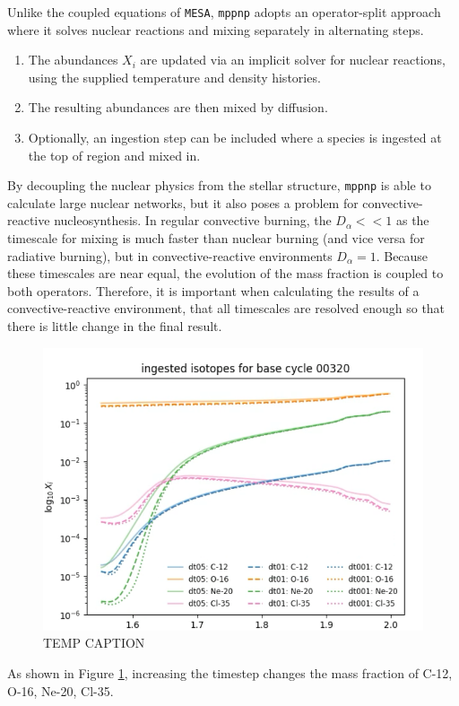 Unlike the coupled equations of \texttt{MESA}, \texttt{mppnp} adopts an operator-split approach where it solves nuclear reactions and mixing separately in alternating steps.

\begin{enumerate}
\item The abundances $X_i$ are updated via an implicit solver for nuclear reactions, using the supplied temperature and density histories.
\item The resulting abundances are then mixed by diffusion.
\item Optionally, an ingestion step can be included where a species is ingested at the top of region and mixed in.
\end{enumerate}

By decoupling the nuclear physics from the stellar structure, \texttt{mppnp} is able to calculate large nuclear networks, but it also poses a problem for convective-reactive nucleosynthesis.
In regular convective burning, the $D_\alpha << 1$ as the timescale for mixing is much faster than nuclear burning (and vice versa for radiative burning), but in convective-reactive environments $D_\alpha = 1$.
Because these timescales are near equal, the evolution of the mass fraction is coupled to both operators. 
Therefore, it is important when calculating the results of a convective-reactive environment, that all timescales are resolved enough so that there is little change in the final result.

\begin{figure}[!htbp]
\includegraphics[width=\textwidth]{chapters/1/figures/time_resolution [temp].png}
\caption{TEMP CAPTION
\label{fig:time_resolution}}
\end{figure}

As shown in Figure \ref{fig:time_resolution}, increasing the timestep changes the mass fraction of C-12, O-16, Ne-20, Cl-35.